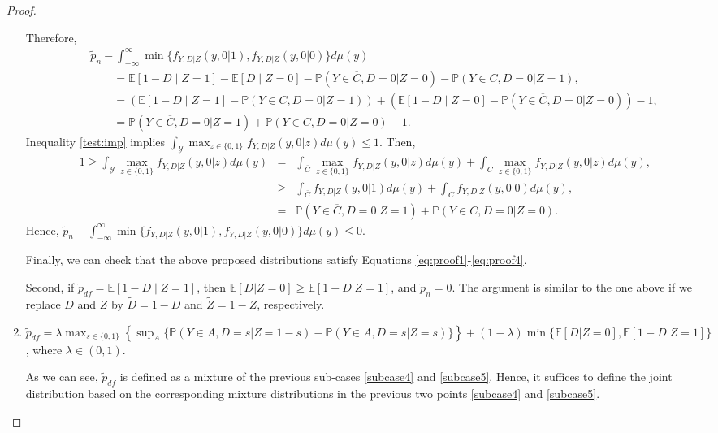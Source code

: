 \documentclass[12pt]{article}
\theoremstyle{plain}
\theoremstyle{definition}
\theoremstyle{remark}
\begin{document}
\begin{proof}
\begin{enumerate}
Therefore, 
\begin{eqnarray*}
  &&\tilde{p}_n -  \int^{\infty}_{-\infty}\min\{f_{Y,D\vert Z}(y,0\vert 1),f_{Y,D\vert Z}(y,0\vert 0)\}d\mu(y)\\
  && \qquad \mathbb = \mathbb E[1-D \mid Z=1]-\mathbb E[D \mid Z=0] - \mathbb{P}(Y \in \overline{C}, D=0 \vert Z=0)-\mathbb{P}(Y \in C, D=0 \vert Z=1),\\
  && \qquad =(\mathbb E[1-D \mid Z=1]-\mathbb{P}(Y \in C, D=0 \vert Z=1)) + (\mathbb E[1-D \mid Z=0]-\mathbb{P}(Y \in \overline{C}, D=0 \vert Z=0))-1,\\
  && \qquad =\mathbb{P}(Y \in \overline{C}, D=0 \vert Z=1)+\mathbb{P}(Y \in C, D=0 \vert Z=0)-1.
\end{eqnarray*}
Inequality \eqref{test:imp} implies $\int_{\mathcal Y} \max_{z\in \{0,1\}}f_{Y,D\vert Z}(y,0\vert z)d\mu(y) \leq 1$. Then,
\begin{eqnarray*}
    1 \geq \int_{\mathcal Y} \max_{z\in \{0,1\}}f_{Y,D\vert Z}(y,0\vert z)d\mu(y) &=& \int_{\overline{C}} \max_{z\in \{0,1\}}f_{Y,D\vert Z}(y,0\vert z)d\mu(y)+\int_{C} \max_{z\in \{0,1\}}f_{Y,D\vert Z}(y,0\vert z)d\mu(y),\\
    &\geq& \int_{\overline{C}} f_{Y,D\vert Z}(y,0\vert 1)d\mu(y)+\int_{C} f_{Y,D\vert Z}(y,0\vert 0)d\mu(y),\\
    &=& \mathbb{P}(Y \in \overline{C}, D=0 \vert Z=1)+\mathbb{P}(Y \in C, D=0 \vert Z=0).
\end{eqnarray*}
Hence, $\tilde{p}_n -  \int^{\infty}_{-\infty}\min\{f_{Y,D\vert Z}(y,0\vert 1),f_{Y,D\vert Z}(y,0\vert 0)\}d\mu(y)\leq 0$. 

Finally, we can check that the above proposed distributions satisfy Equations \eqref{eq:proof1}-\eqref{eq:proof4}. 

Second, if $\tilde{p}_{df}=\mathbb E[1-D \mid Z=1]$, then $\mathbb{E}[D  \vert  Z=0] \geq \mathbb{E}[1-D  \vert  Z=1]$, and $\tilde{p}_n=0$. The argument is similar to the one above if we replace $D$ and $Z$ by $\tilde{D}=1-D$ and $\tilde{Z}=1-Z$, respectively.  

\item \label{subcase6} $\tilde{p}_{df} =\lambda \max_{s \in\{0,1\}}\left\{\sup _A\{\mathbb{P}(Y \in A, D=s  \vert  Z=1-s)-\mathbb{P}(Y \in A, D=s  \vert  Z=s)\}\right\} + (1-\lambda)\min \{\mathbb{E}[D  \vert  Z=0], \mathbb{E}[1-D  \vert  Z=1]\}$, where $\lambda \in (0,1)$.

As we can see, $\tilde{p}_{df}$ is defined as a mixture of the previous sub-cases \ref{subcase4} and \ref{subcase5}. Hence, it suffices to define the joint distribution based on the corresponding mixture distributions in the previous two points \ref{subcase4} and \ref{subcase5}.


\end{enumerate}
\end{proof}
\end{document}
